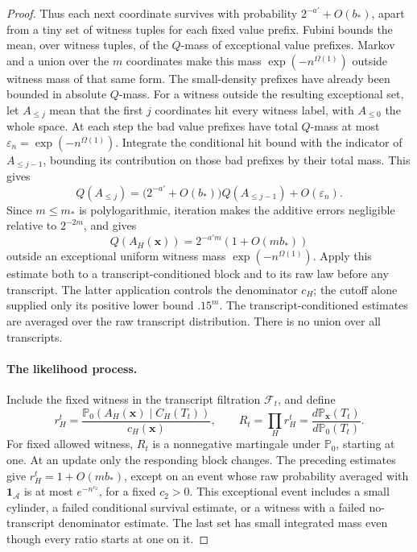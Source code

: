 \begin{proof}
Thus each next coordinate survives with probability
\(2^{-a'}+O(b_*)\), apart from a tiny set of witness tuples for each
fixed value prefix. Fubini bounds the mean, over witness tuples, of
the \(Q\)-mass of exceptional value prefixes. Markov and a union
over the \(m\) coordinates make this mass
\(\exp(-n^{\Omega(1)})\) outside witness mass of that same form.
The small-density prefixes have already been bounded in absolute
\(Q\)-mass. For a witness outside the resulting exceptional set, let
\(A_{\le j}\) mean that the first \(j\) coordinates hit every witness
label, with \(A_{\le0}\) the whole space. At each step the bad value
prefixes have total \(Q\)-mass at most
\(\varepsilon_n=\exp(-n^{\Omega(1)})\). Integrate the conditional hit
bound with the indicator of \(A_{\le j-1}\), bounding its contribution
on those bad prefixes by their total mass. This gives
\[
 Q(A_{\le j})
 =\bigl(2^{-a'}+O(b_*)\bigr)Q(A_{\le j-1})+O(\varepsilon_n).
\]
Since \(m\le m_*\) is polylogarithmic, iteration makes the additive
errors negligible relative to \(2^{-2m}\), and gives
\[
 Q(A_H(\boldsymbol x))
 =2^{-a'm}(1+O(mb_*))
\]
outside an exceptional uniform witness mass \(\exp(-n^{\Omega(1)})\).
Apply this estimate both to a transcript-conditioned block and to its
raw law before any transcript. The latter application controls the
denominator \(c_H\); the cutoff alone supplied only its positive
lower bound \(.15^m\). The transcript-conditioned estimates are
averaged over the raw transcript distribution. There is no union over
all transcripts.

\paragraph{The likelihood process.}
Include the fixed witness in the transcript filtration
\(\mathcal F_t\), and define
\[
 r_H^t=\frac{\mathbb P_0(A_H(\boldsymbol x)\mid C_H(T_t))}{c_H(\boldsymbol x)},
 \qquad R_t=\prod_Hr_H^t
 =\frac{d\mathbb P_{\boldsymbol x}(T_t)}{d\mathbb P_0(T_t)}.
\]
For fixed allowed witness, \(R_t\) is a nonnegative martingale
under \(\mathbb P_0\), starting at one. At an update only the responding block changes.
The preceding estimates give \(r_H^t=1+O(mb_*)\), except on an event
whose raw probability averaged with \(\mathbf1_{\mathcal A}\)
is at most \(e^{-n^{c_2}}\), for a fixed \(c_2>0\). This exceptional
event includes a small cylinder, a failed conditional survival
estimate, or a witness with a failed no-transcript denominator estimate.
The last set has small integrated mass even though every ratio starts
at one on it.


\end{proof}
